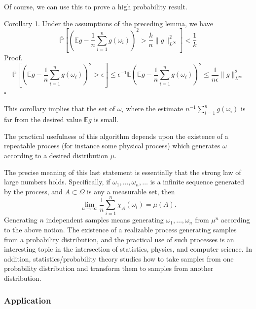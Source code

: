 \documentclass[10pt]{article}
\begin{document}
Of course, we can use this to prove a high probability result.

Corollary 1. Under the assumptions of the preceding lemma, we have
$$
\overline{\mathbb{P}}\left[\left(\mathbb{E} g-\frac{1}{n} \sum_{i=1}^{n} g\left(\omega_{i}\right)\right)^{2}>\frac{k}{n}\|g\|_{L^{\infty}}^{2}\right]<\frac{1}{k}
$$
Proof.
$$
\overline{\mathbb{P}}\left[\left(\mathbb{E} g-\frac{1}{n} \sum_{i=1}^{n} g\left(\omega_{i}\right)\right)^{2}>\epsilon\right] \leq \epsilon^{-1} \overline{\mathbb{E}}\left(\mathbb{E} g-\frac{1}{n} \sum_{i=1}^{n} g\left(\omega_{i}\right)\right)^{2} \leq \frac{1}{n \epsilon}\|g\|_{L^{\infty}}^{2}
$$
$\square$

This corollary implies that the set of $\omega_{i}$ where the estimate $n^{-1} \sum_{i=1}^{n} g\left(\omega_{i}\right)$ is far from the desired value $\mathbb{E} g$ is small.

The practical usefulness of this algorithm depends upon the existence of a repeatable process (for instance some physical process) which generates $\omega$ according to a desired distribution $\mu$.

The precise meaning of this last statement is essentially that the strong law of large numbers holds. Specifically, if $\omega_{1}, \ldots, \omega_{n}, \ldots$ is a infinite sequence generated by the process, and $A \subset \Omega$ is any a measurable set, then
$$
\lim _{n \rightarrow \infty} \frac{1}{n} \sum_{i=1}^{n} \chi_{A}\left(\omega_{i}\right)=\mu(A) .
$$
Generating $n$ independent samples means generating $\omega_{1}, \ldots, \omega_{n}$ from $\mu^{n}$ according to the above notion. The existence of a realizable process generating samples from a probability distribution, and the practical use of such processes is an interesting topic in the intersection of statistics, physics, and computer science. In addition, statistics/probability theory studies how to take samples from one probability distribution and transform them to samples from another distribution.

\subsubsection{Application}
\end{document}
